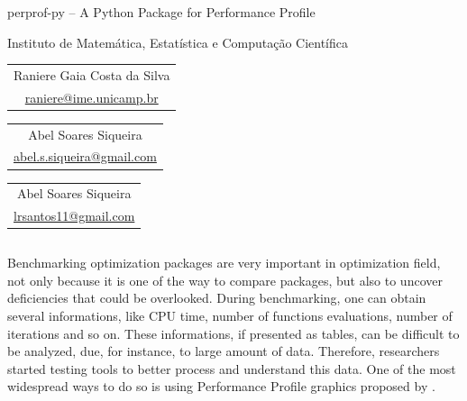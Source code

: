 \documentclass[]{beamer}
\begin{document}
\begin{frame}[t,fragile]
  \begin{center}
    \begin{huge}
      perprof-py -- A Python Package for Performance Profile 

      \vspace{20pt}
      Instituto de Matemática, Estatística e Computação Científica
    \end{huge}

    \vspace{20pt}
    \begin{Large}
      \begin{tabular}[]{c}
        Raniere Gaia Costa da Silva \\
        \url{raniere@ime.unicamp.br}
      \end{tabular} \hspace{5cm}
      \begin{tabular}[]{c}
        Abel Soares Siqueira \\
        \url{abel.s.siqueira@gmail.com}
      \end{tabular} \hspace{5cm}
      \begin{tabular}[]{c}
        Abel Soares Siqueira \\
        \url{lrsantos11@gmail.com}
      \end{tabular}
    \end{Large}
  \end{center}
  \vspace{20pt}

  \begin{columns}[t]
    \begin{column}{0.4\textwidth}
      Benchmarking optimization packages are very important in optimization
      field, not only because it is one of the way to compare packages, but also
      to uncover deficiencies that could be overlooked. During benchmarking, one
      can obtain several informations, like CPU time, number of functions
      evaluations, number of iterations and so on. These informations, if
      presented as tables, can be difficult to be analyzed, due, for instance,
      to large amount of data. Therefore, researchers started testing tools to
      better process and understand this data.  One of the most widespread ways
      to do so is using Performance Profile graphics proposed by
      \citeauthor{Dolan2001}.


\end{column}
\end{columns}
\end{frame}
\end{document}
